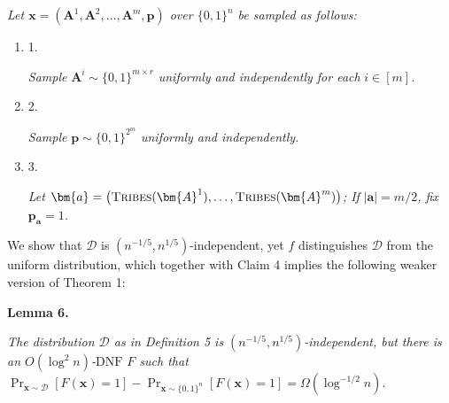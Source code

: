 \emph{Let $\bm{x}=(\bm{A}^{1},\bm{A}^{2},\dots,\bm{A}^{m},\bm{p})$ over $\{0,1\}^{n}$ be sampled as follows:}\par


\begin{enumerate}


\item[] 
1. 


\emph{Sample }$\bm{A}^{i}\sim\{0,1\}^{m\times r}$\emph{ uniformly and independently for each }$i\in[m]$\emph{.}\par





\item[] 
2. 


\emph{Sample }$\bm{p}\sim\{0,1\}^{2^{m}}$\emph{ uniformly and independently.}\par





\item[] 
3. 


\emph{Let }$\bm{a}=\big{(}\textsc{Tribes}(\bm{A}^{1}),\dots,\textsc{Tribes}(\bm{A}^{m})\big{)}$\emph{; If }$|\bm{a}|=m/2$\emph{,
fix }$\bm{p}_{\bm{a}}=1$\emph{.}\par





\end{enumerate}






We show that $\mathcal{D}$ is $(n^{-1/5},n^{1/5})$-independent, yet $f$ distinguishes $\mathcal{D}$ from the uniform
distribution, which together with Claim 4 implies the following weaker version
of Theorem 1:\par





\par\medskip\noindent\textbf{
\textbf{Lemma 6}\textbf{.}
}\par



\emph{The distribution $\mathcal{D}$ as in Definition 5 is $(n^{-1/5},n^{1/5})$-independent, but there is
an $O(\log^{2}n)$-$\mathrm{DNF}$ $F$ such that
$\Pr_{\bm{x}\sim\mathcal{D}}[F(\bm{x})=1]-\Pr_{\bm{x}\sim\{0,1\}^{n}}[F(\bm{x})=1]=\Omega(\log^{-1/2}n).$}\par



